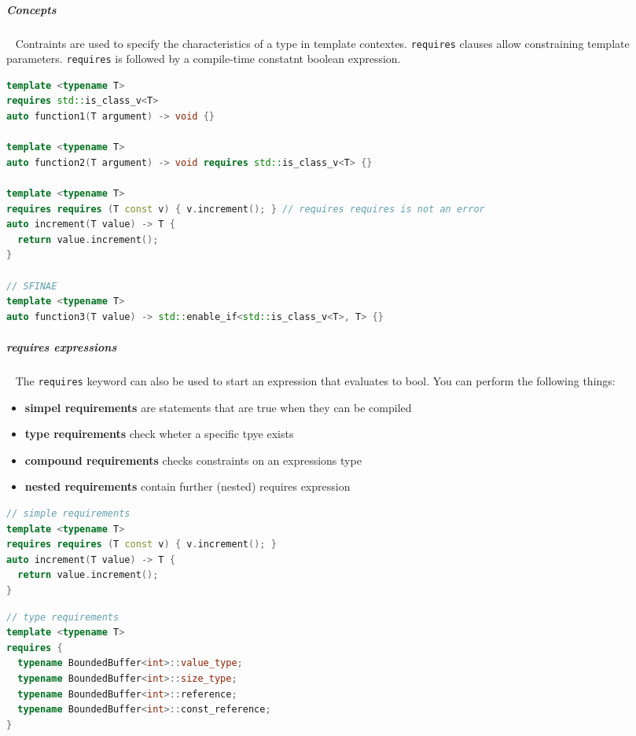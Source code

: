 \documentclass[11pt,twoside,landscape]{article}
\begin{document}
\begin{multicols}{2}
\subparagraph{Concepts} \
\label{sec:orgfe250e8}
Contraints are used to specify the characteristics of a type in template contextes.
\texttt{requires} clauses allow constraining template parameters.
\texttt{requires} is followed by a compile-time constatnt boolean expression.

\begin{lstlisting}[language=c++,label=lst:constraints-vs-sfinae,caption={constraints vs SFINAE},captionpos=b,numbers=none]
template <typename T>
requires std::is_class_v<T>
auto function1(T argument) -> void {}

template <typename T>
auto function2(T argument) -> void requires std::is_class_v<T> {}

template <typename T>
requires requires (T const v) { v.increment(); } // requires requires is not an error
auto increment(T value) -> T {
  return value.increment();
}

// SFINAE
template <typename T>
auto function3(T value) -> std::enable_if<std::is_class_v<T>, T> {}
\end{lstlisting}

\subparagraph{requires expressions} \
\label{sec:orgd7cd134}
The \texttt{requires} keyword can also be used to start an expression that evaluates to bool.
You can perform the following things:
\begin{itemize}
\item \textbf{simpel requirements} are statements that are true when they can be compiled
\item \textbf{type requirements} check wheter a specific tpye exists
\item \textbf{compound requirements} checks constraints on an expressions type
\item \textbf{nested requirements} contain further (nested) requires expression
\end{itemize}


\begin{lstlisting}[language=c++,label=lst:simple-requirements-examples,caption={simple requirements example},captionpos=b,numbers=none]
// simple requirements
template <typename T>
requires requires (T const v) { v.increment(); }
auto increment(T value) -> T {
  return value.increment();
}
\end{lstlisting}

\begin{lstlisting}[language=c++,label=lst:type-requirements-example,caption={type requirements example},captionpos=b,numbers=none]
// type requirements
template <typename T>
requires {
  typename BoundedBuffer<int>::value_type;
  typename BoundedBuffer<int>::size_type;
  typename BoundedBuffer<int>::reference;
  typename BoundedBuffer<int>::const_reference;
}
\end{lstlisting}


\end{multicols}
\end{document}
